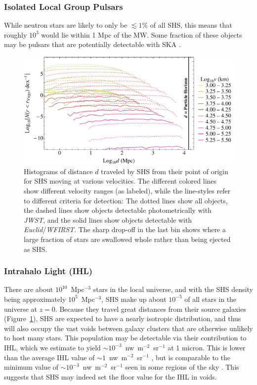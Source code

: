 \documentclass[a4paper,twocolumn]{emulateapj}
\begin{document}
{\subsubsection{Isolated Local Group Pulsars}
While neutron stars are likely to only be $\lesssim 1\%$ of all SHS, this means that roughly $10^{3}$ would lie within 1 Mpc of the MW. Some fraction of these objects may be pulsars that are potentially detectable with SKA \citep{Smits:2009a,Lazio:2013a}.

\begin{figure}
\centering\includegraphics[width=0.8\linewidth,clip=true]{traveld}
\caption{Histograms of distance $d$ traveled by SHS from their point of origin for SHS moving at various velocities. The different colored lines show different velocity ranges (as labeled), while the line-styles refer to different criteria for detection: The dotted lines show all objects, the dashed lines show objects detectable photometrically with {\it JWST}, and the solid lines show objects detectable with {\it Euclid}/{\it WFIRST}. The sharp drop-off in the last bin shows where a large fraction of stars are swallowed whole rather than being ejected as SHS.\vspace{3em}}
\label{fig:traveld}
\end{figure}

\subsubsection{Intrahalo Light (IHL)}
There are about $10^{10}$~Mpc$^{-3}$ stars in the local universe, and with the SHS density being approximately $10^{5}$~Mpc$^{-3}$, SHS make up about $10^{-5}$ of all stars in the universe at $z = 0$. Because they travel great distances from their source galaxies (Figure~\ref{fig:traveld}), SHS are expected to have a nearly isotropic distribution, and thus will also occupy the vast voids between galaxy clusters that are otherwise unlikely to host many stars. This population may be detectable via their contribution to IHL, which we estimate to yield $\sim 10^{-3}$~nw~m$^{-2}$~sr$^{-1}$ at 1 micron. This is lower than the average IHL value of $\sim 1$~nw~m$^{-2}$~sr$^{-1}$ \citep{Cooray:2012b}, but is comparable to the minimum value of $\sim 10^{-3}$~nw~m$^{-2}$~sr$^{-1}$ seen in some regions of the sky \citep{Zemcov:2014a}. This suggests that SHS may indeed set the floor value for the IHL in voids.

}
\end{document}

